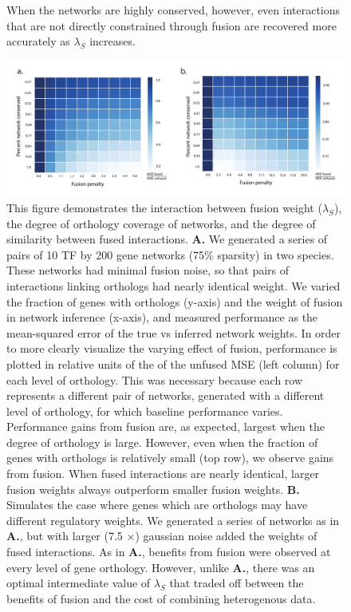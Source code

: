 \documentclass[11pt]{article}
\begin{document}
\begin{figure}
\begin{center}
{  When the networks are highly conserved, however, even interactions that are not directly constrained through fusion are recovered more accurately as $\lambda_S$ increases.}
\end{center}
\end{figure}


\begin{figure}
\begin{center}
  \includegraphics[scale=0.45]{fig2.pdf}
  \caption{\label{syntheticgrid} This figure demonstrates the interaction between fusion weight ($\lambda_S$), the degree of orthology coverage of networks, and the degree of similarity between fused interactions. \textbf{A.} We generated a series of pairs of 10 TF by 200 gene networks (75\% sparsity) in two species. These networks had minimal fusion noise, so that pairs of interactions linking orthologs had nearly identical weight. We varied the fraction of genes with orthologs (y-axis) and the weight of fusion in network inference (x-axis), and measured performance as the mean-squared error of the true vs inferred network weights. 
  In order to more clearly visualize the varying effect of fusion, performance is plotted in relative units of the of the unfused MSE (left column) for each level of orthology. 
  This was necessary because each row represents a different pair of networks, generated with a different level of orthology, for which baseline performance varies. 
  Performance gains from fusion are, as expected, largest when the degree of orthology is large. However, even when the fraction of genes with orthologs is relatively small (top row), we observe gains from fusion. 
  When fused interactions are nearly identical, larger fusion weights always outperform smaller fusion weights. 
  \textbf{B.} Simulates the case where genes which are orthologs may have different regulatory weights. 
  We generated a series of networks as in \textbf{A.}, but with larger (7.5 $\times$) gaussian noise added the weights of fused interactions. 
  As in \textbf{A.}, benefits from fusion were observed at every level of gene orthology. However, unlike \textbf{A.}, there was an optimal intermediate value of $\lambda_S$ that traded off between the benefits of fusion and the cost of combining heterogenous data.}
\end{center}
\end{figure}
\end{document}
